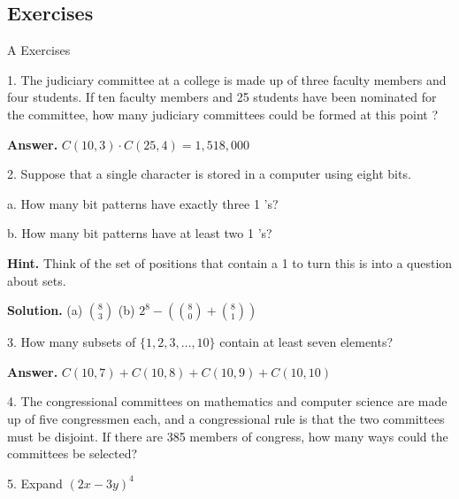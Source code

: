 \documentclass[10pt,]{book}
\theoremstyle{plain}
\theoremstyle{definition}
\theoremstyle{definition}
\theoremstyle{definition}
\begin{document}
\subsection[Exercises]{Exercises}\label{exercises-2-4}
\hypertarget{exercisegroup-8}{}\typeout{************************************************}
\typeout{************************************************}
A Exercises%
\begin{exercisegroup}
\item[1.]\hypertarget{exercise-43}{} The judiciary committee at a college is made up of three faculty members and four students. If ten faculty members and 25 students have been nominated for the committee, how many judiciary committees could be formed at this point	?%
\par\smallskip
\par\smallskip
\noindent\textbf{Answer.}\hypertarget{answer-22}{}\quad
 \(C(10,3)\cdot C(25,4)=1,518,000\)%
\item[2.]\hypertarget{exercise-44}{} Suppose that a single character is stored in a computer using eight bits.%
\par
a. How many bit patterns have exactly three 1 's?%
\par
b. How many bit patterns have at least two 1 's?%
\par\smallskip
\par\smallskip
\noindent\textbf{Hint.}\hypertarget{hint-1}{}\quad
Think of the set of positions that contain a 1 to turn this is into a question about sets.%
\par\smallskip
\noindent\textbf{Solution.}\hypertarget{solution-2}{}\quad
(a) \(\binom{8}{3}\) (b) \(2^8-(\binom{8}{0}+\binom{8}{1})\)%
\item[3.]\hypertarget{exercise-45}{} How many subsets of \(\{1, 2, 3, \dots , 10\}\) contain at least seven elements?%
\par\smallskip
\par\smallskip
\noindent\textbf{Answer.}\hypertarget{answer-23}{}\quad
 \(C(10,7)+C(10,8)+C(10,9)+C(10,10)\) %
\item[4.]\hypertarget{exercise-46}{} The congressional committees on mathematics and computer science are made up of five congressmen each, and a congressional rule is that the two committees must be disjoint. If there are 385 members of congress, how many ways could the committees be selected?%
\par\smallskip
\item[5.]\hypertarget{exercise-47}{}Expand \( ( 2x - 3y )^4\)%

\end{exercisegroup}
\end{document}
